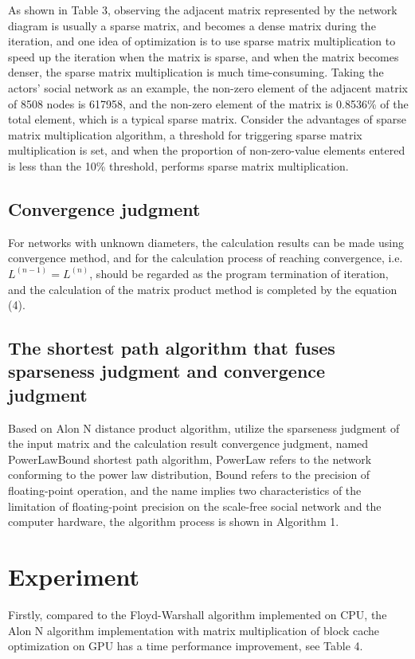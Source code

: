 \documentclass[review]{cvpr}
\begin{document}
As shown in Table 3, observing the adjacent matrix represented by the network diagram is usually a sparse matrix, and becomes a dense matrix during the iteration,
and one idea of optimization is to use sparse matrix multiplication to speed up the iteration when the matrix is sparse, and when the matrix becomes denser, the sparse matrix multiplication is much time-consuming.
Taking the actors' social network as an example, the non-zero element of the adjacent matrix of 8508 nodes is 617958, and the non-zero element of the matrix is 0.8536\% of the total element,
which is a typical sparse matrix. Consider the advantages of sparse matrix multiplication algorithm, a threshold for triggering sparse matrix multiplication is set,
and when the proportion of non-zero-value elements entered is less than the 10\% threshold, performs sparse matrix multiplication.

\subsection{Convergence judgment}

For networks with unknown diameters, the calculation results can be made using convergence method, and for the calculation process of reaching convergence,
i.e. $L^{(n-1)}=L^{(n)}$, should be regarded as the program termination of iteration, and the calculation of the matrix product method is completed by the equation (4).

\subsection{The shortest path algorithm that fuses sparseness judgment and convergence judgment}

Based on Alon N distance product algorithm, utilize the sparseness judgment of the input matrix and the calculation result convergence judgment, named PowerLawBound shortest path algorithm,
PowerLaw refers to the network conforming to the power law distribution, Bound refers to the precision of floating-point operation, and the name implies two characteristics of the limitation
of floating-point precision on the scale-free social network and the computer hardware, the algorithm process is shown in Algorithm 1.

\section{Experiment}

Firstly, compared to the Floyd-Warshall algorithm implemented on CPU, the Alon N algorithm implementation with matrix multiplication of block cache optimization on GPU has a time performance improvement, see Table 4.
\end{document}
